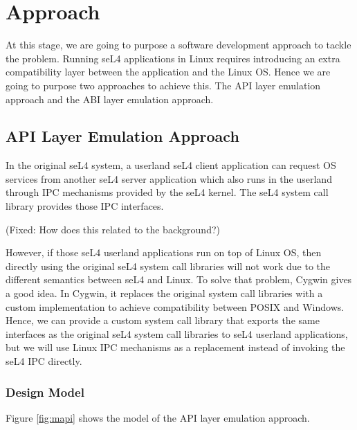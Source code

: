 \chapter{Approach}\label{ch:approaches}

At this stage, we are going to purpose a software development approach to tackle the problem. Running seL4 applications in Linux requires introducing an extra compatibility layer between the application and the Linux OS. Hence we are going to purpose two approaches to achieve this. The API layer emulation approach and the ABI layer emulation approach.  

\section{API Layer Emulation Approach}

In the original seL4 system, a userland seL4 client application can request OS services from another seL4 server application which also runs in the userland through IPC mechanisms provided by the seL4 kernel. The seL4 system call library provides those IPC interfaces. 

(Fixed: How does this related to the background?)

However, if those seL4 userland applications run on top of Linux OS, then directly using the original seL4 system call libraries will not work due to the different semantics between seL4 and Linux. To solve that problem, Cygwin gives a good idea. In Cygwin, it replaces the original system call libraries with a custom implementation to achieve compatibility between POSIX and Windows. Hence, we can provide a custom system call library that exports the same interfaces as the original seL4 system call libraries to seL4 userland applications, but we will use Linux IPC mechanisms as a replacement instead of invoking the seL4 IPC directly.

\subsection{ Design Model}

Figure \ref{fig:mapi} shows the model of the API layer emulation approach. 

